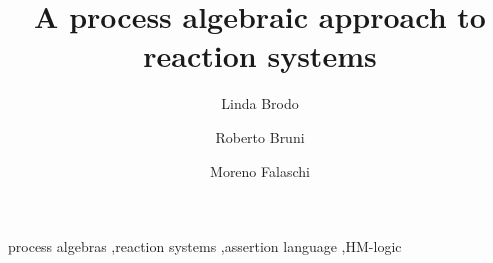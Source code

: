 \documentclass{elsarticle}
\begin{document}
\begin{frontmatter}

\title{A process algebraic approach to reaction systems}



 \author[uniss]{Linda Brodo}
 
 \author[unipi]{Roberto Bruni}
 
 \author[unisi]{Moreno Falaschi}
 
 \address[unipi]{Dipartimento di Informatica, Universit\`{a} di Pisa, Italy}
 \address[uniss]{Dipartimento di Scienze Economiche e Aziendali,   Universit\`a di Sassari, Italy}
 \address[unisi]{Dipartimento di Ingegneria,   Universit\`a di Siena, Italy}
 



\begin{abstract}

\end{abstract}

\begin{keyword}
process algebras \sep reaction systems \sep assertion language \sep HM-logic
\end{keyword}

\end{frontmatter}

\linenumbers





%


%





%

%

\appendix

\end{document}
